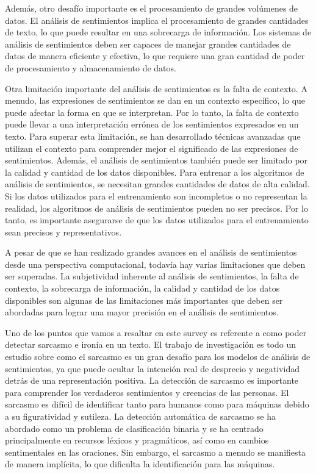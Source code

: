 \documentclass[12pt, conference]{IEEEtran}
\begin{document}
Además, otro desafío importante es el procesamiento de grandes volúmenes de datos. 
El análisis de sentimientos implica el procesamiento de grandes cantidades de texto, lo que puede resultar en una sobrecarga de información. 
Los sistemas de análisis de sentimientos deben ser capaces de manejar grandes cantidades de datos de manera eficiente y efectiva, lo que requiere una gran cantidad de poder de procesamiento y almacenamiento de datos.

Otra limitación importante del análisis de sentimientos es la falta de contexto. 
A menudo, las expresiones de sentimientos se dan en un contexto específico, lo que puede afectar la forma en que se interpretan. 
Por lo tanto, la falta de contexto puede llevar a una interpretación errónea de los sentimientos expresados en un texto. 
Para superar esta limitación, se han desarrollado técnicas avanzadas que utilizan el contexto para comprender mejor el significado de las expresiones de sentimientos. Además, el análisis de sentimientos también puede ser limitado por la calidad y cantidad de los datos disponibles. 
Para entrenar a los algoritmos de análisis de sentimientos, se necesitan grandes cantidades de datos de alta calidad. 
Si los datos utilizados para el entrenamiento son incompletos o no representan la realidad, los algoritmos de análisis de sentimientos pueden no ser precisos. 
Por lo tanto, es importante asegurarse de que los datos utilizados para el entrenamiento sean precisos y representativos.

A pesar de que se han realizado grandes avances en el análisis de sentimientos desde una perspectiva computacional, todavía hay varias limitaciones que deben ser superadas. 
La subjetividad inherente al análisis de sentimientos, la falta de contexto, la sobrecarga de información, la calidad y cantidad de los datos disponibles son algunas de las limitaciones más importantes que deben ser abordadas para lograr una mayor precisión en el análisis de sentimientos.

Uno de los puntos que vamos a resaltar en este survey es referente a como poder detectar sarcasmo e ironía en un texto. El trabajo de investigación \cite{b4} es todo un estudio sobre como el sarcasmo es un gran desafío para los modelos de análisis de sentimientos, ya que puede ocultar la intención real de desprecio y negatividad detrás de una representación positiva. La detección de sarcasmo es importante para comprender los verdaderos sentimientos y creencias de las personas. El sarcasmo es difícil de identificar tanto para humanos como para máquinas debido a su figuratividad y sutileza. La detección automática de sarcasmo se ha abordado como un problema de clasificación binaria y se ha centrado principalmente en recursos léxicos y pragmáticos, así como en cambios sentimentales en las oraciones. Sin embargo, el sarcasmo a menudo se manifiesta de manera implícita, lo que dificulta la identificación para las máquinas.
\end{document}
